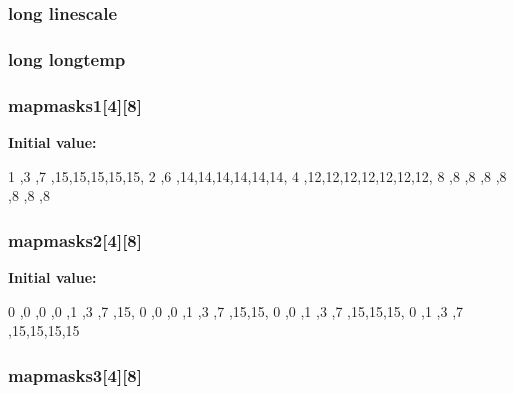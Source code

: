 \label{CONTIGSC_8C_a1f5a9f548c7a29c13b62f5fdc2a24ea8}
\hypertarget{CONTIGSC_8C_ab632e78b4009b275cfa1629ac26b4be1}{
\subsubsection[{linescale}]{\setlength{\rightskip}{0pt plus 5cm}long {\bf linescale}}}
\label{CONTIGSC_8C_ab632e78b4009b275cfa1629ac26b4be1}
\hypertarget{CONTIGSC_8C_ab21e1dd6476595095fa335682b93094e}{
\subsubsection[{longtemp}]{\setlength{\rightskip}{0pt plus 5cm}long {\bf longtemp}}}
\label{CONTIGSC_8C_ab21e1dd6476595095fa335682b93094e}
\hypertarget{CONTIGSC_8C_ac94f1a50e42c5f020505d6c1b77c4f5e}{
\subsubsection[{mapmasks1}]{ {\bf mapmasks1}\mbox{[}4\mbox{]}\mbox{[}8\mbox{]}}}
\label{CONTIGSC_8C_ac94f1a50e42c5f020505d6c1b77c4f5e}
{\bfseries Initial value:}
\begin{DoxyCode}
 {
{1 ,3 ,7 ,15,15,15,15,15},
{2 ,6 ,14,14,14,14,14,14},
{4 ,12,12,12,12,12,12,12},
{8 ,8 ,8 ,8 ,8 ,8 ,8 ,8} }
\end{DoxyCode}
\hypertarget{CONTIGSC_8C_a41f7ecdc70d7ae35ee9d6594f950d37c}{
\subsubsection[{mapmasks2}]{ {\bf mapmasks2}\mbox{[}4\mbox{]}\mbox{[}8\mbox{]}}}
\label{CONTIGSC_8C_a41f7ecdc70d7ae35ee9d6594f950d37c}
{\bfseries Initial value:}
\begin{DoxyCode}
 {
{0 ,0 ,0 ,0 ,1 ,3 ,7 ,15},
{0 ,0 ,0 ,1 ,3 ,7 ,15,15},
{0 ,0 ,1 ,3 ,7 ,15,15,15},
{0 ,1 ,3 ,7 ,15,15,15,15} }
\end{DoxyCode}
\hypertarget{CONTIGSC_8C_ab39851371b2e506e131e50d79d8550d8}{
\subsubsection[{mapmasks3}]{ {\bf mapmasks3}\mbox{[}4\mbox{]}\mbox{[}8\mbox{]}}}
